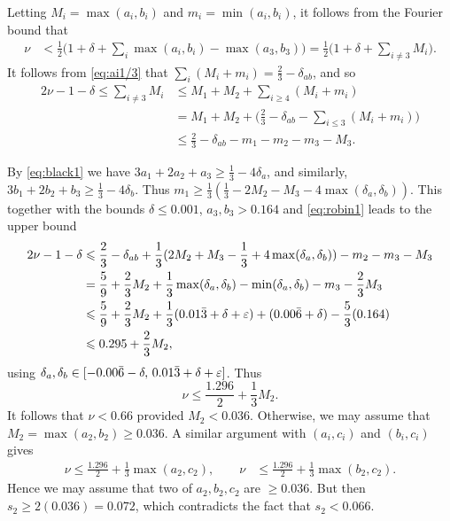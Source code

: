 Letting $M_i = \max(a_i, b_i)$ and  $m_i = \min(a_i, b_i)$, it follows from  the Fourier bound that
\begin{align*}
\nu &< \frac{1}{2}\Big(1+\delta+\sum_{i}\max(a_i, b_i) - \max(a_3,b_3)\Big) = \frac{1}{2}\Big(1+\delta+\sum_{i\neq3}M_i\Big).
\end{align*}
It follows from \eqref{eq:ai1/3} that
$\sum_i (M_i+m_i)=\frac{2}{3}-\delta_{ab}$, and so
\begin{align*}
2\nu-1 -\delta\le \sum_{i\neq3}M_i
&\le M_1+M_2 + \sum_{i\ge4}(M_i+m_i)\\
&= M_1+M_2 + \Big(\frac{2}{3} - \delta_{ab} - \sum_{i\le3}(M_i+m_i)\Big)\\
& \le \frac{2}{3} - \delta_{ab} - m_1 - m_2  - m_3 - M_3.
\end{align*}


By \eqref{eq:black1} we have $3a_1 + 2a_2 + a_3 \ge \frac{1}{3}-4\delta_a$, and similarly,
$3b_1 + 2b_2 +b_3 \ge \frac{1}{3}-4\delta_b$. Thus $m_1 \ge \frac{1}{3}(\frac{1}{3}-2M_2 - M_3-4\max(\delta_a,\delta_b))$.
This together with the bounds $\delta\leq 0.001$, $a_3,b_3>0.164$ and \eqref{eq:robin1}  leads to the upper bound
\begin{align*}
2\nu-1 -\delta
& \leqslant \frac{2}{3}
-\delta_{ab}
+ \frac{1}{3}(2M_2 + M_3-\frac{1}{3}+4\max(\delta_a,\delta_b)) - m_2 - m_3 - M_3 \\
& = \frac{5}{9} +  \frac{2}{3}M_2
+\frac{1}{3}\max(\delta_a,\delta_b)- \min(\delta_a,\delta_b)
- m_3 - \frac{2}{3}M_3  \\
&\leqslant \frac{5}{9} +  \frac{2}{3}M_2+
\frac{1}{3}(0.01\bar{3}+\delta+\varepsilon) + (0.00\bar{6}+\delta)
- \frac{5}{3}(0.164)\\
&\leqslant 0.295+\frac{2}{3}M_2,
\end{align*}
using $\delta_a,\delta_b\in [-0.00\bar{6}-\delta,\, 0.01\bar{3}+\delta+\varepsilon]$.
Thus
$$
\nu\leq \frac{1.296}{2}+\frac{1}{3}M_2.
$$
It follows that
  $\nu< 0.66$ provided $M_2 < 0.036$.
  Otherwise, we may assume that $M_2=\max(a_2,b_2) \geq  0.036$.
A similar argument with $(a_i,c_i)$ and $(b_i,c_i)$ gives
\begin{align*}
\nu
 \leq  \frac{1.296}{2}+\frac{1}{3}\max(a_2,c_2),\qquad
\nu & \leq  \frac{1.296}{2}+ \frac{1}{3}\max(b_2,c_2).
\end{align*}
Hence we may assume that two of $a_2,b_2,c_2$ are $\geq 0.036$. But then $s_2 \geq 2( 0.036) = 0.072$, which contradicts the fact that $s_2< 0.066$.
